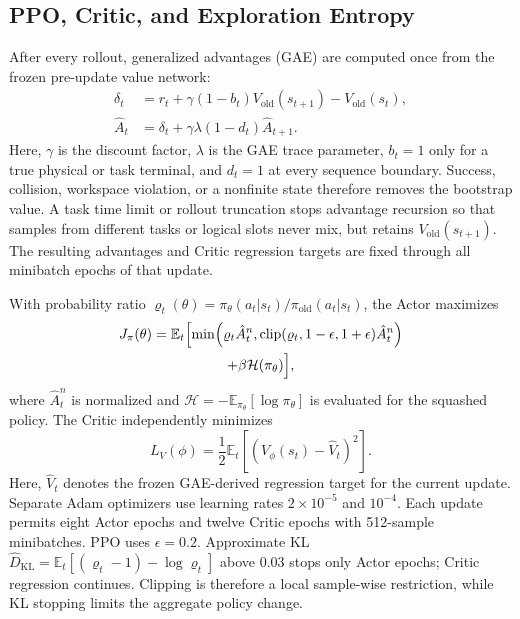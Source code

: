 \documentclass[conference]{IEEEtran}
\begin{document}
\subsection{PPO, Critic, and Exploration Entropy}

After every rollout, generalized advantages (GAE) \cite{schulman2015gae} are computed once from the frozen pre-update value network:
\begin{align}
\delta_t&=r_t+\gamma(1-b_t)V_{\mathrm{old}}(s_{t+1})
-V_{\mathrm{old}}(s_t),\nonumber\\
\hat A_t&=\delta_t+\gamma\lambda(1-d_t)\hat A_{t+1}.
\label{eq:gae}
\end{align}
Here, $\gamma$ is the discount factor, $\lambda$ is the GAE trace parameter, $b_t=1$ only for a true physical or task terminal, and $d_t=1$ at every sequence boundary. Success, collision, workspace violation, or a nonfinite state therefore removes the bootstrap value. A task time limit or rollout truncation stops advantage recursion so that samples from different tasks or logical slots never mix, but retains $V_{\mathrm{old}}(s_{t+1})$. The resulting advantages and Critic regression targets are fixed through all minibatch epochs of that update.

With probability ratio $\varrho_t(\theta)=\pi_\theta(a_t|s_t)/\pi_{\mathrm{old}}(a_t|s_t)$, the Actor maximizes
\begin{equation}
\begin{gathered}
J_\pi(\theta)=\mathbb E_t\Bigl[
\min\Bigl(\varrho_t\hat A_t^n,\operatorname{clip}(\varrho_t,1-\epsilon,1+\epsilon)\hat A_t^n\Bigr)\\
+\beta\mathcal H(\pi_\theta)\Bigr],
\end{gathered}
\label{eq:ppo}
\end{equation}
where $\hat A_t^n$ is normalized and
$\mathcal H=-\mathbb E_{\pi_\theta}[\log\pi_\theta]$ is evaluated for the squashed policy. The Critic independently minimizes
\begin{equation}
L_V(\phi)=\frac{1}{2}\mathbb E_t
\left[(V_\phi(s_t)-\hat V_t)^2\right].
\label{eq:critic}
\end{equation}
Here, $\hat V_t$ denotes the frozen GAE-derived regression target for the current update.
Separate Adam optimizers use learning rates $2\times10^{-5}$ and $10^{-4}$. Each update permits eight Actor epochs and twelve Critic epochs with 512-sample minibatches. PPO uses $\epsilon=0.2$. Approximate KL $\widehat D_{\mathrm{KL}}=\mathbb E_t[(\varrho_t-1)-\log \varrho_t]$ above 0.03 stops only Actor epochs; Critic regression continues. Clipping is therefore a local sample-wise restriction, while KL stopping limits the aggregate policy change.
\end{document}

